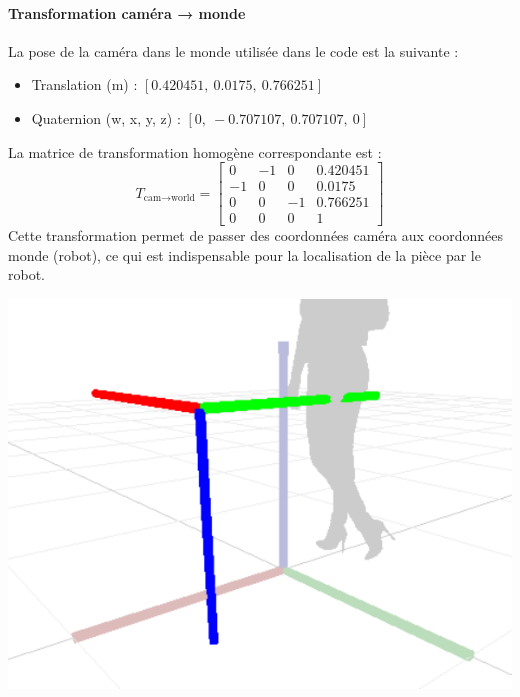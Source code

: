 \begin{minipage}{0.55\textwidth}
    \paragraph{Transformation caméra → monde}
    La pose de la caméra dans le monde utilisée dans le code est la suivante :
    \begin{itemize}
        \item Translation (m) : $[0.420451,\ 0.0175,\ 0.766251]$
        \item Quaternion (w, x, y, z) : $[0,\ -0.707107,\ 0.707107,\ 0]$
    \end{itemize}
    {}%
    La matrice de transformation homogène correspondante est :
    \begin{equation*}
        T_{\text{cam} \to \text{world}} =
        \begin{bmatrix}
            0  & -1 & 0  & 0.420451 \\
            -1 & 0  & 0  & 0.0175   \\
            0  & 0  & -1 & 0.766251 \\
            0  & 0  & 0  & 1
        \end{bmatrix}
    \end{equation*}
    Cette transformation permet de passer des coordonnées caméra aux coordonnées monde (robot), ce qui est indispensable pour la localisation de la pièce par le robot.
\end{minipage}%
\hfill
\begin{minipage}{0.4\textwidth}
    \centering
    \includegraphics[width=0.95\linewidth]{assets/figures/Transform_example.png}
\end{minipage}

